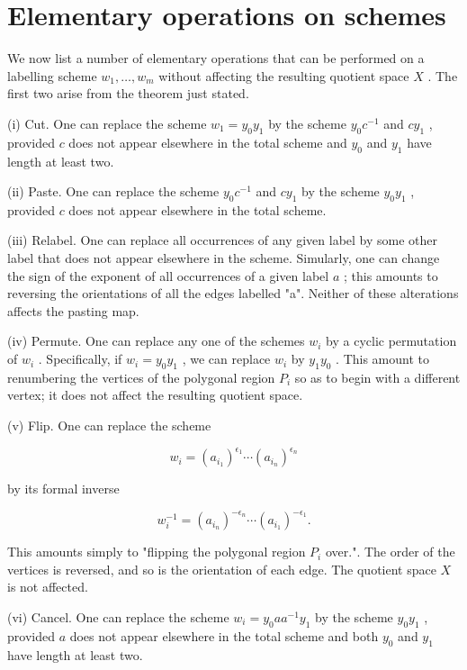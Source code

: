 \section*{Elementary operations on schemes}

We now list a number of elementary operations that can be performed on a labelling scheme \({w}_{1},\ldots ,{w}_{m}\) without affecting the resulting quotient space \(X\) . The first two arise from the theorem just stated.

(i) Cut. One can replace the scheme \({w}_{1} = {y}_{0}{y}_{1}\) by the scheme \({y}_{0}{c}^{-1}\) and \(c{y}_{1}\) , provided \(c\) does not appear elsewhere in the total scheme and \({y}_{0}\) and \({y}_{1}\) have length at least two.

(ii) Paste. One can replace the scheme \({y}_{0}{c}^{-1}\) and \(c{y}_{1}\) by the scheme \({y}_{0}{y}_{1}\) , provided \(c\) does not appear elsewhere in the total scheme.

(iii) Relabel. One can replace all occurrences of any given label by some other label that does not appear elsewhere in the scheme. Simularly, one can change the sign of the exponent of all occurrences of a given label \(a\) ; this amounts to reversing the orientations of all the edges labelled "a". Neither of these alterations affects the pasting map.

(iv) Permute. One can replace any one of the schemes \({w}_{i}\) by a cyclic permutation of \({w}_{i}\) . Specifically, if \({w}_{i} = {y}_{0}{y}_{1}\) , we can replace \({w}_{i}\) by \({y}_{1}{y}_{0}\) . This amount to renumbering the vertices of the polygonal region \({P}_{i}\) so as to begin with a different vertex; it does not affect the resulting quotient space.

(v) Flip. One can replace the scheme

\[
{w}_{i} = {\left( {a}_{{i}_{1}}\right) }^{{\epsilon }_{1}}\cdots {\left( {a}_{{i}_{n}}\right) }^{{\epsilon }_{n}}
\]

by its formal inverse

\[
{w}_{i}^{-1} = {\left( {a}_{{i}_{n}}\right) }^{-{\epsilon }_{n}}\cdots {\left( {a}_{{i}_{1}}\right) }^{-{\epsilon }_{1}}.
\]

This amounts simply to "flipping the polygonal region \({P}_{i}\) over.". The order of the vertices is reversed, and so is the orientation of each edge. The quotient space \(X\) is not affected.

(vi) Cancel. One can replace the scheme \({w}_{i} = {y}_{0}a{a}^{-1}{y}_{1}\) by the scheme \({y}_{0}{y}_{1}\) , provided \(a\) does not appear elsewhere in the total scheme and both \({y}_{0}\) and \({y}_{1}\) have length at least two.

